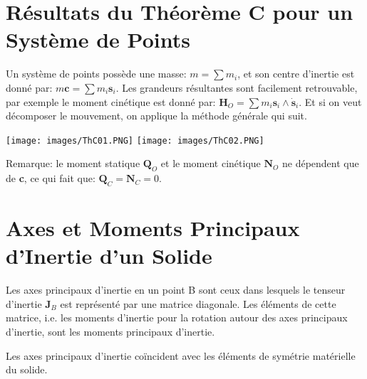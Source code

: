\documentclass[a4paper]{article}
\begin{document}
\section{Résultats du Théorème C pour un Système de Points}





Un système de points possède une masse: $ m = \sum m_i $, et son centre d'inertie est donné par: $ m \textbf{c} = \sum m_i \textbf{s}_i $. Les grandeurs résultantes sont facilement retrouvable, par exemple le moment cinétique est donné par: $ \textbf{H}_O = \sum m_i \textbf{s}_i \wedge \dot{\textbf{s}}_i $. Et si on veut décomposer le mouvement, on applique la méthode générale qui suit.

\begin{center}
\texttt{[image: images/ThC01.PNG]}
\texttt{[image: images/ThC02.PNG]}
\end{center}

Remarque: le moment statique $ \textbf{Q}_O $ et le moment cinétique $ \textbf{N}_O $ ne dépendent que de \textbf{c}, ce qui fait que: $ \textbf{Q}_C = \textbf{N}_C = 0 $.










\section{Axes et Moments Principaux d’Inertie d’un Solide}





Les axes principaux d’inertie en un point B sont ceux dans lesquels le tenseur d’inertie $ \textbf{J}_B $ est représenté par une matrice diagonale. Les éléments de cette matrice, i.e. les moments d’inertie pour la rotation autour des axes principaux d’inertie, sont les moments principaux d’inertie.

Les axes principaux d’inertie coïncident avec les éléments de symétrie matérielle du solide.
\end{document}
